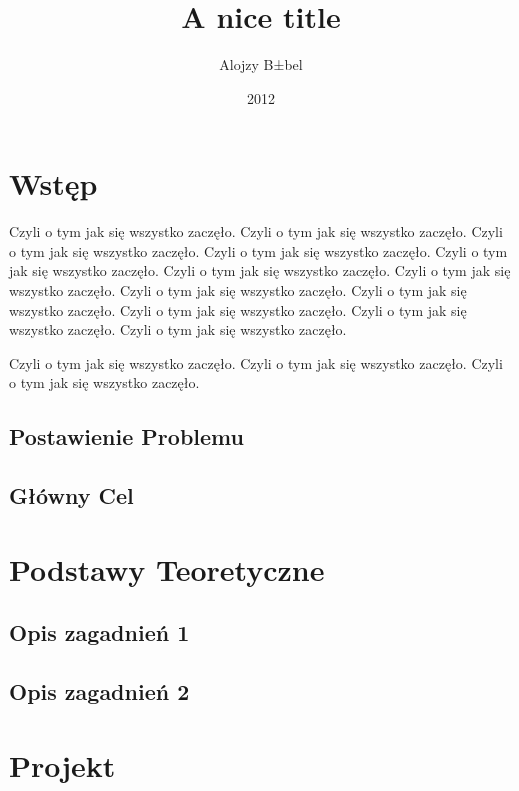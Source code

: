 \documentclass[american]{inz}
\title{A nice title}
\author{Alojzy B±bel}
\date{2012}
\begin{document}
\maketitle


\chapter{Wstęp}
\label{chap:wstep}

Czyli o tym jak się wszystko zaczęło.
Czyli o tym jak się wszystko zaczęło.
Czyli o tym jak się wszystko zaczęło.
Czyli o tym jak się wszystko zaczęło.
Czyli o tym jak się wszystko zaczęło.
Czyli o tym jak się wszystko zaczęło.
Czyli o tym jak się wszystko zaczęło.
Czyli o tym jak się wszystko zaczęło.
Czyli o tym jak się wszystko zaczęło.
Czyli o tym jak się wszystko zaczęło.
Czyli o tym jak się wszystko zaczęło.
Czyli o tym jak się wszystko zaczęło.
 

Czyli o tym jak się wszystko zaczęło.
Czyli o tym jak się wszystko zaczęło.
Czyli o tym jak się wszystko zaczęło.

\section{Postawienie Problemu}
\label{sec:problem}

\section{Główny Cel}
\label{sec:cel}


\chapter{Podstawy Teoretyczne}
\label{chap:teoria}



\section{Opis zagadnień 1}
\label{sec:zagadnienia1}

\section{Opis zagadnień 2}
\label{sec:zagadnienia2}


\chapter{Projekt}
\label{chap:projekt}
\end{document}
